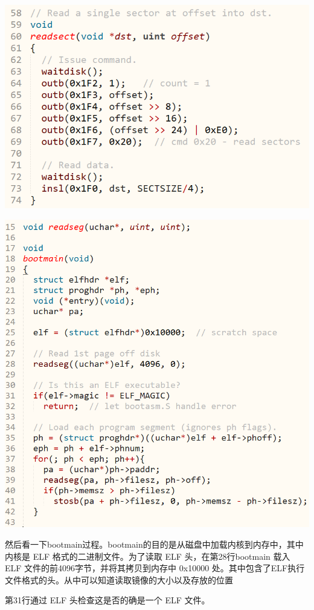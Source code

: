 \includegraphics[width=6in]{figures/boot/fig8.png}

\includegraphics[width=6in]{figures/boot/fig9.png}

然后看一下bootmain过程。bootmain的目的是从磁盘中加载内核到内存中，其中内核是 ELF 格式的二进制文件。为了读取 ELF 头，在第28行bootmain 载入 ELF 文件的前4096字节，并将其拷贝到内存中 0x10000 处。其中包含了ELF执行文件格式的头。从中可以知道读取镜像的大小以及存放的位置

第31行通过 ELF 头检查这是否的确是一个 ELF 文件。

